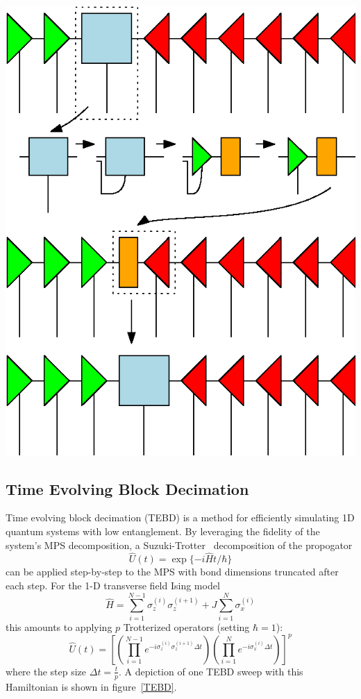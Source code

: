 \documentclass[12pt]{article}
\newenvironment{Figure}
  {\par\medskip\noindent\minipage{\linewidth}}
  {\endminipage\par\medskip}
\begin{document}
\begin{multicols}{2}
	\begin{Figure}
		\center\includegraphics[width=.7\textwidth]{./Figures/move-ortho-center.eps}
		\label{moving-ortho-center}
	\end{Figure}


	\subsection*{Time Evolving Block Decimation}
	Time evolving block decimation (TEBD) is a method for efficiently
	simulating 1D quantum systems with low entanglement. By leveraging
	the fidelity of the system's MPS decomposition, a
	Suzuki-Trotter~\cite{suzuki}
	decomposition of the propogator
	$$\hat{U}(t)=\exp\{-i\hat{H}t/\hbar\}$$
	can be applied step-by-step to the MPS with bond dimensions truncated
	after each step. For the 1-D transverse field Ising model
	$$\hat{H}=\sum_{i=1}^{N-1}\sigma_z^{(i)}\sigma_z^{(i+1)}+J\sum_{i=1}^N\sigma_x^{(i)}$$
	this amounts to applying $p$ Trotterized operators (setting $\hbar=1$):
	\[
		\hat{U}(t) =
		\left[
			\left(\prod_{i=1}^{N-1}
				e^{-i\sigma_z^{(i)}\sigma_z^{(i+1)}\Delta t}
			\right)
			\left(\prod_{i=1}^Ne^{-i\sigma_x^{(i)}\Delta t}\right)
		\right]^p
	\]
	where the step size $\Delta t=\frac{t}{p}$. A depiction of one TEBD
	sweep with this Hamiltonian is shown in figure~\ref{TEBD}.


\end{multicols}
\end{document}
